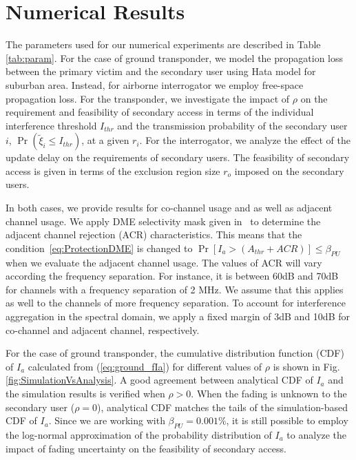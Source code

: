 \documentclass[12pt,submission,journal,onecolumn]{IEEEtran}
\begin{document}
\section{Numerical Results}
\label{sec:NumericalResults}
The parameters used for our numerical experiments are described in Table \ref{tab:param}. For the case of ground transponder, we model the propagation loss between the primary victim and the secondary user using Hata model for suburban area. Instead, for airborne interrogator we employ free-space propagation loss. For the transponder, we investigate the impact of $\rho$ on the requirement and feasibility of secondary access in terms of the individual interference threshold $I_{thr}$ and the transmission probability of the secondary user $i$, $\Pr(\tilde{\xi}_{i}\leq I_{thr})$, at a given $r_{i}$. For the interrogator, we analyze the effect of the update delay on the requirements of secondary users. The feasibility of secondary access is given in terms of the exclusion region size $r_{o}$ imposed on the secondary users.

In both cases, we provide results for co-channel usage and as well as adjacent channel usage. We apply DME selectivity mask given in~\cite{ecc96} to determine the adjacent channel rejection (ACR) characteristics. This means that the condition~\eqref{eq:ProtectionDME} is changed to $\Pr[I_{a}> (A_{thr}+ ACR)]\leq\beta_{PU}$ when we evaluate the adjacent channel usage. The values of ACR will vary according the frequency separation. For instance, it is between 60dB and 70dB for channels with a frequency separation of 2 MHz. We assume that this applies as well to the channels of more frequency separation. To account for interference aggregation in the spectral domain, we apply a fixed margin of 3dB and 10dB for co-channel and adjacent channel, respectively.

For the case of ground transponder, the cumulative distribution function (CDF) of $I_{a}$ calculated from (\ref{eq:ground_fIa}) for different values of $\rho$ is shown in Fig. \ref{fig:SimulationVsAnalysis}. A good agreement between analytical CDF of $I_{a}$ and the simulation results is verified when $\rho>0$. When the fading is unknown to the secondary user ($\rho = 0$), analytical CDF matches the tails of the simulation-based CDF of $I_{a}$. Since we are working with $\beta_{PU} = 0.001\%$, it is still possible to employ the log-normal approximation of the probability distribution of $I_{a}$ to analyze the impact of fading uncertainty on the feasibility of secondary access.
\end{document}
